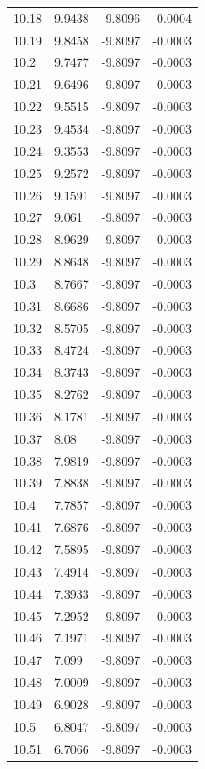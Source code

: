 \begin{tabular}{llll}
10.18 & 9.9438 & -9.8096 & -0.0004 \\
10.19 & 9.8458 & -9.8097 & -0.0003 \\
10.2 & 9.7477 & -9.8097 & -0.0003 \\
10.21 & 9.6496 & -9.8097 & -0.0003 \\
10.22 & 9.5515 & -9.8097 & -0.0003 \\
10.23 & 9.4534 & -9.8097 & -0.0003 \\
10.24 & 9.3553 & -9.8097 & -0.0003 \\
10.25 & 9.2572 & -9.8097 & -0.0003 \\
10.26 & 9.1591 & -9.8097 & -0.0003 \\
10.27 & 9.061 & -9.8097 & -0.0003 \\
10.28 & 8.9629 & -9.8097 & -0.0003 \\
10.29 & 8.8648 & -9.8097 & -0.0003 \\
10.3 & 8.7667 & -9.8097 & -0.0003 \\
10.31 & 8.6686 & -9.8097 & -0.0003 \\
10.32 & 8.5705 & -9.8097 & -0.0003 \\
10.33 & 8.4724 & -9.8097 & -0.0003 \\
10.34 & 8.3743 & -9.8097 & -0.0003 \\
10.35 & 8.2762 & -9.8097 & -0.0003 \\
10.36 & 8.1781 & -9.8097 & -0.0003 \\
10.37 & 8.08 & -9.8097 & -0.0003 \\
10.38 & 7.9819 & -9.8097 & -0.0003 \\
10.39 & 7.8838 & -9.8097 & -0.0003 \\
10.4 & 7.7857 & -9.8097 & -0.0003 \\
10.41 & 7.6876 & -9.8097 & -0.0003 \\
10.42 & 7.5895 & -9.8097 & -0.0003 \\
10.43 & 7.4914 & -9.8097 & -0.0003 \\
10.44 & 7.3933 & -9.8097 & -0.0003 \\
10.45 & 7.2952 & -9.8097 & -0.0003 \\
10.46 & 7.1971 & -9.8097 & -0.0003 \\
10.47 & 7.099 & -9.8097 & -0.0003 \\
10.48 & 7.0009 & -9.8097 & -0.0003 \\
10.49 & 6.9028 & -9.8097 & -0.0003 \\
10.5 & 6.8047 & -9.8097 & -0.0003 \\
10.51 & 6.7066 & -9.8097 & -0.0003 \\

\end{tabular}
